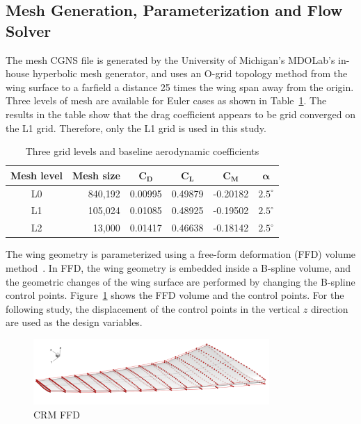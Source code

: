\subsection{Mesh Generation, Parameterization and Flow Solver}
The mesh CGNS file is generated by the University of Michigan's MDOLab's in-house hyperbolic mesh generator, and uses an O-grid topology method from the wing surface to a farfield a distance 25 times the wing span away from the origin. Three levels of mesh are available for Euler cases as shown in Table~\ref{tab:euler_mesh}. 
The results in the table show that the drag coefficient appears to be grid converged on the L1 grid. Therefore, only the L1 grid is used in this study. 

\begin{table}[H]
  \begin{center}
    \caption{Three grid levels and baseline aerodynamic coefficients
    \label{tab:euler_mesh}}
  \begin{tabular}{ c r c c c c }
 \textbf{Mesh level}   &  \textbf{Mesh size}  & $\mathbf{C_D}$ & $\mathbf{C_L} $ & $\mathbf{C_M}$ & $\mathbf{\alpha}$  \\\hline
 L0                  &  840,192   & 0.00995   & 0.49879 & -0.20182  & $2.5^{\circ}$   \\
 L1                  &  105,024   & 0.01085   & 0.48925 & -0.19502    & $2.5^{\circ}$ \\
 L2 		      &   13,000    &  0.01417   & 0.46638    & -0.18142  &  	$2.5^{\circ}$ 	 
  \end{tabular}
  \end{center}
\end{table}

The wing geometry is parameterized using a free-form deformation (FFD) volume method~\cite{Kenway:2010:C}. In FFD, the wing geometry is embedded inside a B-spline volume, and the geometric changes of the wing surface are performed by changing the B-spline control points.
Figure~\ref{fig:crm_ffd} shows the FFD volume and the control points. For the following study, the displacement of the control points in the vertical $z$ direction are used as the design variables. 

 \begin{figure}[tbp]
  \centering
  \includegraphics[clip,width=0.8\textwidth]{./figs/chap7_aso/CRM-wing-FFD.png}%
  \caption{CRM FFD \label{fig:crm_ffd} \cite{2015lyu_crm}}
\end{figure}

